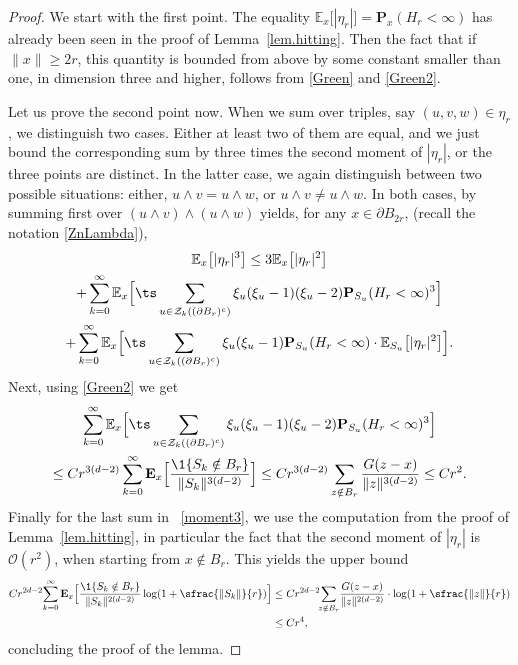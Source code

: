 \begin{proof}
We start with the first point. The equality $\mathbb E_x\big[|\eta_r|\big]=\mathbf P_x(H_r<\infty)$ has already been seen in the proof of Lemma~\ref{lem.hitting}. Then the fact that if $\|x\|\ge 2r$, this quantity is bounded from above by some constant smaller than one, in dimension three and higher, follows from \eqref{Green} and \eqref{Green2}.

Let us prove the second point now. When we sum over triples, say $(u,v,w)\in \eta_r$, we distinguish two cases.
Either at least two of them are equal, and we just bound the corresponding sum by three times the second moment of $|\eta_r|$,
or the three points are distinct. In the latter case, we again
distinguish between two possible situations:
either, $u\wedge v = u\wedge w$, or $u\wedge v \neq u\wedge w$.
In both cases, by summing first over $(u\wedge v)\wedge(u\wedge w)$ yields,
for any $x\in \partial B_{2r}$, (recall the notation \eqref{ZnLambda}),
\begin{multline}\label{moment3}
\mathbb E_x\big[|\eta_r|^3\big]
\le 3\mathbb E_x\big[|\eta_r|^2\big]\\
+ \sum_{k=0}^\infty \mathbb E_x\Big[\ts
\sum_{u\in \mathcal Z_k((\partial B_r)^c)}
\xi_u(\xi_u-1)(\xi_u-2) \mathbf P_{S_u}(H_r <\infty)^3\Big]\\
+ \sum_{k=0}^\infty
\mathbb E_x\Big[\ts\sum_{u\in \mathcal Z_k((\partial B_r)^c)}
\xi_u(\xi_u-1) \mathbf P_{S_u}(H_r <\infty)\cdot \mathbb E_{S_u} \big[|\eta_r|^2\big] \Big].
\end{multline}
Next, using \eqref{Green2} we get
\begin{multline*}
\sum_{k=0}^\infty \mathbb E_x\Big[\ts\sum_{u\in \mathcal Z_k((\partial B_r)^c)}
\xi_u(\xi_u-1)(\xi_u-2) \mathbf P_{S_u}(H_r <\infty)^3\Big]\\
\le C r^{3(d-2)} \sum_{k=0}^\infty
\mathbf E_x\Big[\frac{\1\{S_k\notin B_r\}}{\|S_k\|^{3(d-2)}} \Big]\le Cr^{3(d-2)} \sum_{z\notin B_r} \frac{G(z-x)}{\|z\|^{3(d-2)}}\le Cr^2.
\end{multline*}
Finally for the last sum in ~\eqref{moment3}, we use the computation from the proof of Lemma~\ref{lem.hitting}, in particular the fact that
the second moment of $|\eta_r|$ is $\mathcal O(r^2)$, when starting from $x\notin B_r$.
This yields the upper bound
\begin{align*}
Cr^{2d-2}\!\sum_{k=0}^\infty \mathbf E_x\Big[\frac{\1\{S_k\notin B_r\}}{ \|S_k\|^{2(d-2)}}\log(1+\sfrac{\|S_k\|}{r}) \Big] &\le Cr^{2d-2}\!\!\sum_{z\notin B_r}\!
\frac{G(z-x)}{\|z\|^{2(d-2)}}\cdot \log (1+\sfrac{\|z\|}{r})\\
&\le Cr^4,
\end{align*}
concluding the proof of the lemma.
\end{proof}

